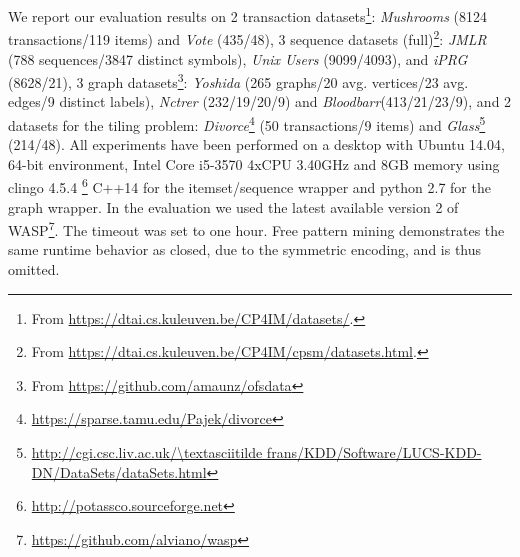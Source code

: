 We report our evaluation results on 2 transaction datasets\!\footnote{From \url{https://dtai.cs.kuleuven.be/CP4IM/datasets/}.}: \textit{Mushrooms} (8124 transactions/119 items) and \textit{Vote} (435/48), 3 sequence datasets (full)\!\footnote{From \url{https://dtai.cs.kuleuven.be/CP4IM/cpsm/datasets.html}.}: \textit{JMLR} (788 sequences/3847 distinct symbols), \textit{Unix Users} (9099/4093), and \textit{iPRG} (8628/21), 3 graph datasets\!\footnote{From \url{https://github.com/amaunz/ofsdata}}: \textit{Yoshida} (265 graphs/20 avg. vertices/23 avg. edges/9 distinct labels), \textit{Nctrer} (232/19/20/9) and \textit{Bloodbarr}(413/21/23/9), and 2 datasets for the tiling problem: \emph{Divorce}\footnote{\url{https://sparse.tamu.edu/Pajek/divorce}}  (50 transactions/9 items) and \emph{Glass}\footnote{\url{http://cgi.csc.liv.ac.uk/\textasciitilde frans/KDD/Software/LUCS-KDD-DN/DataSets/dataSets.html}} (214/48).
%
All experiments have been performed on a desktop with Ubuntu 14.04, 64-bit environment, Intel Core i5-3570 4xCPU 3.40GHz and 8GB memory using clingo 4.5.4 \!\footnote{\url{http://potassco.sourceforge.net}} C++14 for the itemset/sequence wrapper and python 2.7 for the graph wrapper. In the evaluation we used %
the latest available version 2 of WASP\footnote{\url{https://github.com/alviano/wasp}}. %
The timeout was set to one hour. Free pattern mining demonstrates the same runtime behavior as closed, due to the symmetric encoding, and is thus omitted. %
